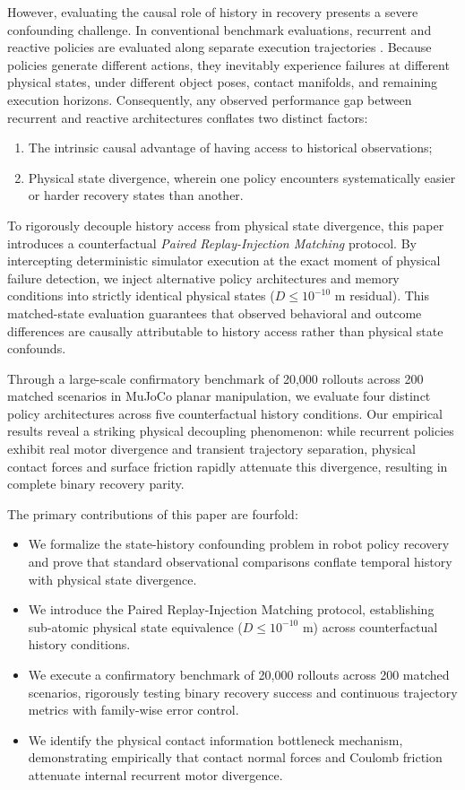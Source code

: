 \documentclass[letterpaper, 10 pt, conference]{ieeeconf}
\begin{document}
However, evaluating the causal role of history in recovery presents a severe confounding challenge. In conventional benchmark evaluations, recurrent and reactive policies are evaluated along separate execution trajectories \cite{liu2023libero}. Because policies generate different actions, they inevitably experience failures at different physical states, under different object poses, contact manifolds, and remaining execution horizons. Consequently, any observed performance gap between recurrent and reactive architectures conflates two distinct factors:
\begin{enumerate}
    \item The intrinsic causal advantage of having access to historical observations;
    \item Physical state divergence, wherein one policy encounters systematically easier or harder recovery states than another.
\end{enumerate}

To rigorously decouple history access from physical state divergence, this paper introduces a counterfactual \emph{Paired Replay-Injection Matching} protocol. By intercepting deterministic simulator execution at the exact moment of physical failure detection, we inject alternative policy architectures and memory conditions into strictly identical physical states ($D \le 10^{-10}\text{ m}$ residual). This matched-state evaluation guarantees that observed behavioral and outcome differences are causally attributable to history access rather than physical state confounds.

Through a large-scale confirmatory benchmark of 20,000 rollouts across 200 matched scenarios in MuJoCo planar manipulation, we evaluate four distinct policy architectures across five counterfactual history conditions. Our empirical results reveal a striking physical decoupling phenomenon: while recurrent policies exhibit real motor divergence and transient trajectory separation, physical contact forces and surface friction rapidly attenuate this divergence, resulting in complete binary recovery parity.

The primary contributions of this paper are fourfold:
\begin{itemize}
    \item We formalize the state-history confounding problem in robot policy recovery and prove that standard observational comparisons conflate temporal history with physical state divergence.
    \item We introduce the Paired Replay-Injection Matching protocol, establishing sub-atomic physical state equivalence ($D \le 10^{-10}\text{ m}$) across counterfactual history conditions.
    \item We execute a confirmatory benchmark of 20,000 rollouts across 200 matched scenarios, rigorously testing binary recovery success and continuous trajectory metrics with family-wise error control.
    \item We identify the physical contact information bottleneck mechanism, demonstrating empirically that contact normal forces and Coulomb friction attenuate internal recurrent motor divergence.
\end{itemize}
\end{document}
